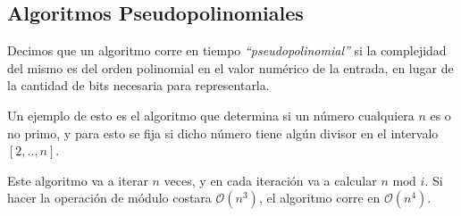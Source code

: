 \subsection{Algoritmos Pseudopolinomiales}

Decimos que un algoritmo corre en tiempo \emph{``pseudopolinomial''} si la complejidad del mismo es del orden polinomial en el valor num\'erico de la entrada, en lugar de la cantidad de bits necesaria para representarla.

Un ejemplo de esto es el algoritmo que determina si un n\'umero cualquiera $n$ es o no primo, y para esto se fija si dicho n\'umero tiene alg\'un divisor en el intervalo $[2, .., n]$.

Este algoritmo va a iterar $n$ veces, y en cada iteraci\'on va a calcular $n \textrm{ mod } i$. Si hacer la operaci\'on de m\'odulo costara $\mathcal{O}(n^3)$, el algoritmo corre en $\mathcal{O}(n^4)$.